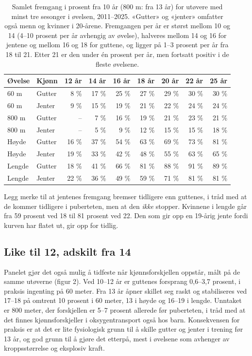 \begin{table}[t]
\centering
{\sffamily\small
\begin{tabular}{@{}llrrrrrrr@{}}
\toprule
\textbf{Øvelse} & \textbf{Kjønn} & \textbf{12 år} & \textbf{14 år} & \textbf{16 år} & \textbf{18 år} & \textbf{20 år} & \textbf{22 år} & \textbf{25 år} \\
\midrule
60 m & Gutter & 8 \% & 17 \% & 25 \% & 27 \% & 29 \% & 30 \% & 30 \% \\
60 m & Jenter & 9 \% & 15 \% & 19 \% & 21 \% & 22 \% & 24 \% & 24 \% \\
800 m & Gutter & – & 7 \% & 16 \% & 19 \% & 21 \% & 23 \% & 21 \% \\
800 m & Jenter & – & 5 \% & 9 \% & 12 \% & 15 \% & 15 \% & 18 \% \\
Høyde & Gutter & 16 \% & 37 \% & 54 \% & 63 \% & 69 \% & 73 \% & 81 \% \\
Høyde & Jenter & 19 \% & 33 \% & 42 \% & 48 \% & 55 \% & 63 \% & 65 \% \\
Lengde & Gutter & 18 \% & 41 \% & 66 \% & 81 \% & 88 \% & 91 \% & 89 \% \\
Lengde & Jenter & 22 \% & 36 \% & 49 \% & 59 \% & 71 \% & 81 \% & 81 \% \\
\bottomrule
\end{tabular}}
\caption{Samlet fremgang i prosent fra 10 år (800 m: fra 13 år) for utøvere med minst tre sesonger i øvelsen, 2011–2025. «Gutter» og «jenter» omfatter også menn og kvinner i 20-årene. Fremgangen per år er størst mellom 10 og 14 (4–10 prosent per år avhengig av øvelse), halveres mellom 14 og 16 for jentene og mellom 16 og 18 for guttene, og ligger på 1–3 prosent per år fra 18 til 21. Etter 21 er den under én prosent per år, men fortsatt positiv i de fleste øvelsene.}
\end{table}

Legg merke til at jentenes fremgang bremser tidligere enn guttenes, i tråd
med at de kommer tidligere i puberteten, men at den \emph{ikke} stopper. Kvinnene
i lengde går fra 59 prosent ved 18 til 81 prosent ved 22. Den som gir opp en
19-årig jente fordi kurven har flatet ut, gir opp for tidlig.

\subsection{Like til 12, adskilt fra 14}\label{like-til-12-adskilt-fra-14}

Panelet gjør det også mulig å tidfeste når kjønnsforskjellen oppstår, målt
på de samme utøverne (figur 2). Ved 10--12 år er guttenes forsprang 0,6--3,7
prosent, i praksis ingenting på 60 meter. Fra 13 år åpner skillet seg raskt og
stabiliseres ved 17--18 på omtrent 10 prosent i 60 meter, 13 i høyde og 16--19
i lengde. Unntaket er 800 meter, der forskjellen er 5--7 prosent allerede før
puberteten, i tråd med at det finnes kjønnsforskjeller i oksygentransport
også hos barn. Konsekvensen for praksis er at det er lite fysiologisk grunn
til å skille gutter og jenter i trening før 13 år, og god grunn til å gjøre
det etterpå, mest i øvelsene som avhenger av kroppsstørrelse og eksplosiv
kraft.

